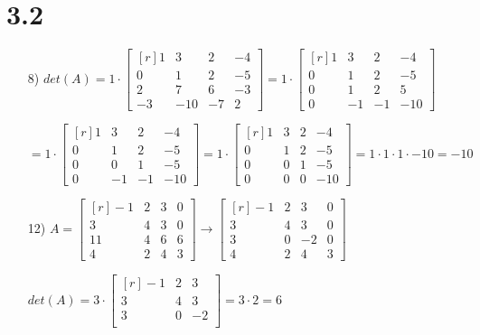 \documentclass{article}
\begin{document}
  \section * {3.2}
  \begin{enumerate}
    \item[8)]
      $det(A) = 1\cdot\begin{bmatrix*}[r]
        1&3&2&-4\\
        0&1&2&-5\\
        2&7&6&-3\\
        -3&-10&-7&2
      \end{bmatrix*}
      = 1\cdot\begin{bmatrix*}[r]
        1&3&2&-4\\
        0&1&2&-5\\
        0&1&2&5\\
        0&-1&-1&-10
      \end{bmatrix*}$

      $=1\cdot\begin{bmatrix*}[r]
        1&3&2&-4\\
        0&1&2&-5\\
        0&0&1&-5\\
        0&-1&-1&-10
        \end{bmatrix*}=1\cdot\begin{bmatrix*}[r]
        1&3&2&-4\\
        0&1&2&-5\\
        0&0&1&-5\\
        0&0&0&-10
        \end{bmatrix*}=1\cdot1\cdot1\cdot-10=-10$

    \item[12)]
    $
      A=\begin{bmatrix*}[r]
        -1&2&3&0\\
        3&4&3&0\\
        11&4&6&6\\
        4&2&4&3
      \end{bmatrix*}\rightarrow
      \begin{bmatrix*}[r]
        -1&2&3&0\\
        3&4&3&0\\
        3&0&-2&0\\
        4&2&4&3
      \end{bmatrix*}
    $

    $
      det(A)=3\cdot\begin{bmatrix*}[r]
        -1&2&3\\
          3&4&3\\
          3&0&-2\\
        \end{bmatrix*}
      =3\cdot2=6  
    $


\end{enumerate}
\end{document}
